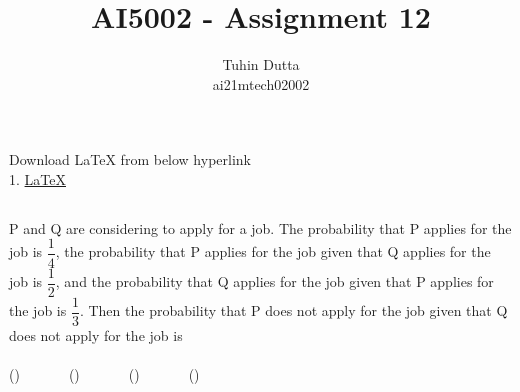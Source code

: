 \documentclass[journal,12pt,twocolumn]{IEEEtran}
\begin{document}
\providecommand{\mtx}[1]{\mathbf{#1}}
\providecommand{\fourier}{\overset{\mathcal{F}}{ \rightleftharpoons}}
\providecommand{\system}{\overset{\mathcal{H}}{ \longleftrightarrow}}
\newcommand{\solution}{\noindent \textbf{Solution: }}
\newcommand{\cosec}{\,\text{cosec}\,}
\providecommand{\dec}[2]{\ensuremath{\overset{#1}{\underset{#2}{\gtrless}}}}
\newcommand{\myvec}[1]{\ensuremath{\begin{pmatrix}#1\end{pmatrix}}}
\newcommand{\mydet}[1]{\ensuremath{\begin{vmatrix}#1\end{vmatrix}}}
\makeatletter
{}
\makeatother
\let\StandardTheFigure\thefigure
\let\vec\mathbf
\renewcommand{\thefigure}{\theproblem}
\def\putbox#1#2#3{\makebox[0in][l]{\makebox[#1][l]{}\raisebox{\baselineskip}[0in][0in]{\raisebox{#2}[0in][0in]{#3}}}}
     \def\rightbox#1{\makebox[0in][r]{#1}}
     \def\centbox#1{\makebox[0in]{#1}}
     \def\topbox#1{\raisebox{-\baselineskip}[0in][0in]{#1}}
     \def\midbox#1{\raisebox{-0.5\baselineskip}[0in][0in]{#1}}
\vspace{3cm}
\title{AI5002 - Assignment 12}
\author{Tuhin Dutta\\ ai21mtech02002}
\maketitle
\newpage
\bigskip
\renewcommand{\thefigure}{\theenumi}
\renewcommand{\thetable}{\theenumi}
\begin{mdframed}
Download LaTeX from below hyperlink\\
1. \href{https://github.com/Tauhait/AI5002/tree/main/Assignment-12/LaTeX}{LaTeX}
\end{mdframed}
\subsection*{}
P and Q are considering to apply for a job. The probability that P applies for the job is $\dfrac{1}{4}$, the probability that P applies for the job given that Q applies for the job is $\dfrac{1}{2}$, and the probability that Q applies for the job given that P applies for the job is $\dfrac{1}{3}$. Then the probability that P does not apply for the job given that Q does not apply for the job is\\
\\
()\ \ \ \ \ \ \ ()\ \ \ \ \ \ \ ()\ \ \ \ \ \ \ ()\ \ \ \ \ \ \
\end{document}
